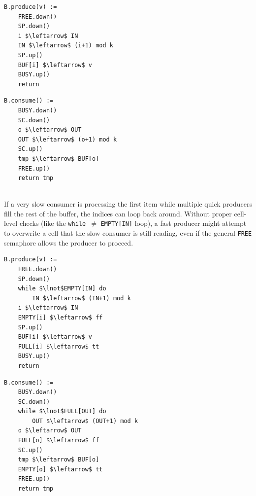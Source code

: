 \begin{minipage}{\textwidth}
\begin{minipage}{0.45\textwidth}
\begin{lstlisting}[mathescape]
B.produce(v) :=
    FREE.down()
    SP.down()
    i $\leftarrow$ IN
    IN $\leftarrow$ (i+1) mod k
    SP.up() 
    BUF[i] $\leftarrow$ v
    BUSY.up()
    return
\end{lstlisting}
\end{minipage}
\hfill
\begin{minipage}{0.45\textwidth}
\begin{lstlisting}[mathescape]
B.consume() :=
    BUSY.down()
    SC.down()
    o $\leftarrow$ OUT
    OUT $\leftarrow$ (o+1) mod k
    SC.up()
    tmp $\leftarrow$ BUF[o]
    FREE.up()
    return tmp
\end{lstlisting}
\end{minipage}
\end{minipage}\\

If a very slow consumer is processing the first item while multiple quick producers fill the rest of the buffer, the indices can loop back around. Without proper cell-level checks (like the \texttt{while }$\neq$ \texttt{EMPTY[IN]} loop), a fast producer might attempt to overwrite a cell that the slow consumer is still reading, even if the general \texttt{FREE} semaphore allows the producer to proceed.

\begin{minipage}{\textwidth}
\begin{minipage}{0.45\textwidth}
\begin{lstlisting}[mathescape]
B.produce(v) :=
    FREE.down()
    SP.down()
    while $\lnot$EMPTY[IN] do
        IN $\leftarrow$ (IN+1) mod k
    i $\leftarrow$ IN
    EMPTY[i] $\leftarrow$ ff
    SP.up()
    BUF[i] $\leftarrow$ v
    FULL[i] $\leftarrow$ tt
    BUSY.up()
    return
\end{lstlisting}
\end{minipage}
\hfill
\begin{minipage}{0.45\textwidth}
\begin{lstlisting}[mathescape]
B.consume() :=
    BUSY.down()
    SC.down()
    while $\lnot$FULL[OUT] do
        OUT $\leftarrow$ (OUT+1) mod k
    o $\leftarrow$ OUT
    FULL[o] $\leftarrow$ ff
    SC.up()
    tmp $\leftarrow$ BUF[o]
    EMPTY[o] $\leftarrow$ tt
    FREE.up()
    return tmp
\end{lstlisting}
\end{minipage}
\end{minipage}\\

